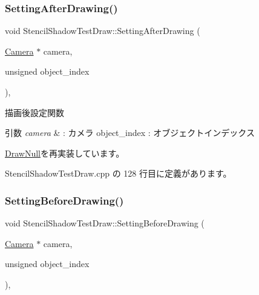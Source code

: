\subsubsection{\texorpdfstring{Setting\+After\+Drawing()}{SettingAfterDrawing()}}
{\footnotesize\ttfamily void Stencil\+Shadow\+Test\+Draw\+::\+Setting\+After\+Drawing (\begin{DoxyParamCaption}\item[{\mbox{\hyperlink{class_camera}{Camera}} $\ast$}]{camera,  }\item[{unsigned}]{object\+\_\+index }\end{DoxyParamCaption})\hspace{0.3cm}{\ttfamily [override]}, {\ttfamily [virtual]}}



描画後設定関数 


\begin{DoxyParams}{引数}
{\em camera} & \+: カメラ object\+\_\+index \+: オブジェクトインデックス \\
\hline
\end{DoxyParams}


\mbox{\hyperlink{class_draw_null_a3600d14d2ce10f4281723567f97c08be}{Draw\+Null}}を再実装しています。



 Stencil\+Shadow\+Test\+Draw.\+cpp の 128 行目に定義があります。

\mbox{\label{class_stencil_shadow_test_draw_a0f697b6dad67048c7f8916a53cca6b1c}} 
\subsubsection{\texorpdfstring{Setting\+Before\+Drawing()}{SettingBeforeDrawing()}}
{\footnotesize\ttfamily void Stencil\+Shadow\+Test\+Draw\+::\+Setting\+Before\+Drawing (\begin{DoxyParamCaption}\item[{\mbox{\hyperlink{class_camera}{Camera}} $\ast$}]{camera,  }\item[{unsigned}]{object\+\_\+index }\end{DoxyParamCaption})\hspace{0.3cm}{\ttfamily [override]}, {\ttfamily [virtual]}}



